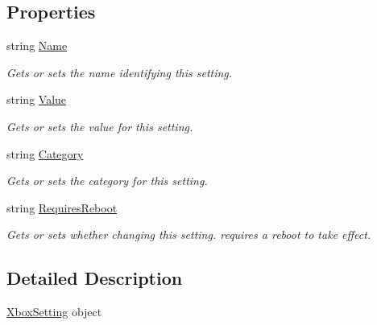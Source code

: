 \subsection*{Properties}
\begin{DoxyCompactItemize}
\item 
string \hyperlink{class_microsoft_1_1_tools_1_1_windows_device_portal_1_1_device_portal_1_1_xbox_setting_a60b2a6ed911aaf220b5d039d45ab5efd}{Name}
\begin{DoxyCompactList}\small\item\em Gets or sets the name identifying this setting. \end{DoxyCompactList}\item 
string \hyperlink{class_microsoft_1_1_tools_1_1_windows_device_portal_1_1_device_portal_1_1_xbox_setting_a0beb396762460a97d9e84499c6d98ea0}{Value}
\begin{DoxyCompactList}\small\item\em Gets or sets the value for this setting. \end{DoxyCompactList}\item 
string \hyperlink{class_microsoft_1_1_tools_1_1_windows_device_portal_1_1_device_portal_1_1_xbox_setting_a860f2b6adf43fea19cc6c07182b097a1}{Category}
\begin{DoxyCompactList}\small\item\em Gets or sets the category for this setting. \end{DoxyCompactList}\item 
string \hyperlink{class_microsoft_1_1_tools_1_1_windows_device_portal_1_1_device_portal_1_1_xbox_setting_a0bba2f18e03f57ea5446f17fc45149b1}{Requires\+Reboot}
\begin{DoxyCompactList}\small\item\em Gets or sets whether changing this setting. requires a reboot to take effect. \end{DoxyCompactList}\end{DoxyCompactItemize}


\subsection{Detailed Description}
\hyperlink{class_microsoft_1_1_tools_1_1_windows_device_portal_1_1_device_portal_1_1_xbox_setting}{Xbox\+Setting} object 




